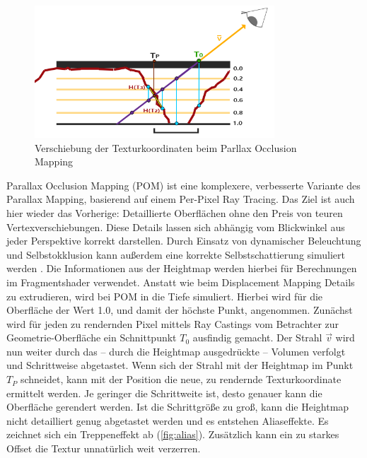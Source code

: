 \begin{figure}[h]
	\centering
	\includegraphics[width=0.8\textwidth]{Grafiken/Basics/Mapping/Infografik_POM.png}
	\begin{footnotesize}
		\caption{Verschiebung der Texturkoordinaten beim Parllax Occlusion Mapping}
	\end{footnotesize}
\end{figure}


Parallax Occlusion Mapping (POM) ist eine komplexere, verbesserte Variante des Parallax Mapping, basierend auf einem Per-Pixel Ray Tracing.
Das Ziel ist auch hier wieder das Vorherige: Detaillierte Oberflächen ohne den Preis von teuren Vertexverschiebungen.
Diese Details lassen sich abhängig vom Blickwinkel aus jeder Perspektive korrekt darstellen.
Durch Einsatz von dynamischer Beleuchtung und Selbstokklusion kann außerdem eine korrekte Selbstschattierung simuliert werden \parencite{Brawley2004, Tatarchuk2006}.
Die Informationen aus der Heightmap werden hierbei für Berechnungen im Fragmentshader verwendet.
Anstatt wie beim Displacement Mapping Details zu extrudieren, wird bei POM in die Tiefe simuliert.
Hierbei wird für die Oberfläche der Wert 1.0, und damit der höchste Punkt, angenommen.
Zunächst wird für jeden zu rendernden Pixel mittels Ray Castings vom Betrachter zur Geometrie-Oberfläche ein Schnittpunkt  $T_0$ ausfindig gemacht.
Der Strahl $\vec{v}$ wird nun weiter durch das – durch die Heightmap ausgedrückte – Volumen verfolgt und Schrittweise abgetastet. Wenn sich der Strahl 
mit der Heightmap im Punkt $T_P$ schneidet, kann mit der Position die neue, zu rendernde Texturkoordinate ermittelt werden. 
Je geringer die Schrittweite ist, desto genauer kann die Oberfläche gerendert werden.
Ist die Schrittgröße zu groß, kann die Heightmap nicht detailliert genug abgetastet werden und es entstehen Aliaseffekte. Es zeichnet sich
ein Treppeneffekt ab (\autoref{fig:alias}). Zusätzlich kann ein zu starkes Offset die Textur unnatürlich weit verzerren. 


